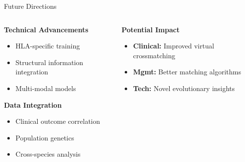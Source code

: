 \documentclass[aspectratio=169]{beamer}
\newcommand{\formanagement}[1]{\textcolor{managementcolor}{\textbf{Mgmt:} #1}}
\newcommand{\forclinical}[1]{\textcolor{clinicalcolor}{\textbf{Clinical:} #1}}
\newcommand{\forbioinformatics}[1]{\textcolor{bioinfocolor}{\textbf{Tech:} #1}}
\begin{document}
\begin{frame}{Future Directions}
  \begin{columns}
    \begin{column}{0.5\textwidth}
      \textbf{Technical Advancements}
      \begin{itemize}\small
        \item HLA-specific training
        \item Structural information integration
        \item Multi-modal models
      \end{itemize}
      
      \textbf{Data Integration}
      \begin{itemize}\small
        \item Clinical outcome correlation
        \item Population genetics
        \item Cross-species analysis
      \end{itemize}
    \end{column}
    \begin{column}{0.5\textwidth}
      \textbf{Potential Impact}
      \begin{itemize}\small
        \item \forclinical{Improved virtual crossmatching}
        \item \formanagement{Better matching algorithms}
        \item \forbioinformatics{Novel evolutionary insights}
      \end{itemize}
    \end{column}
  \end{columns}
\end{frame}
\end{document}

